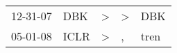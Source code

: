 \begin{supertabular}{lllll}
 12-31-07 &   DBK &  \textgreater &  \textgreater &   DBK \\
 05-01-08 &  ICLR &  \textgreater &             , &  tren \\
\end{supertabular}
